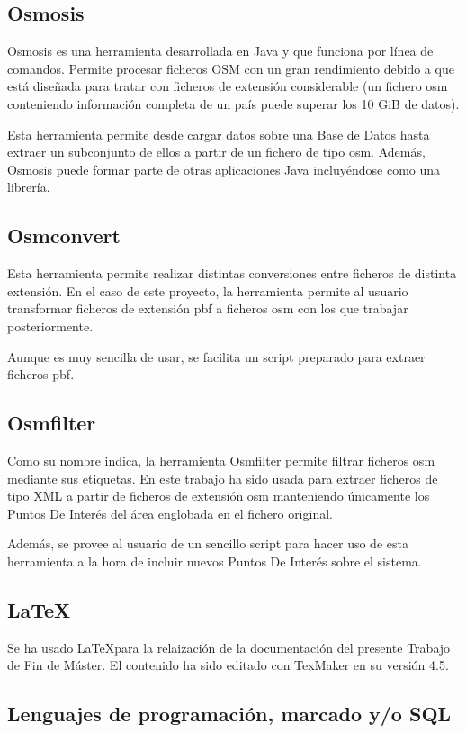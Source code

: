 \subsection{Osmosis}
Osmosis es una herramienta desarrollada en Java y que funciona por línea de comandos. Permite procesar ficheros OSM con un gran rendimiento debido a que está diseñada para tratar con ficheros de extensión considerable (un fichero osm conteniendo información completa de un país puede superar los 10 GiB de datos).

Esta herramienta permite desde cargar datos sobre una Base de Datos hasta extraer un subconjunto de ellos a partir de un fichero de tipo osm. Además, Osmosis puede formar parte de otras aplicaciones Java incluyéndose como una librería.

\subsection{Osmconvert}
Esta herramienta permite realizar distintas conversiones entre ficheros de distinta extensión. En el caso de este proyecto, la herramienta permite al usuario transformar ficheros de extensión pbf a ficheros osm con los que trabajar posteriormente.

Aunque es muy sencilla de usar, se facilita un script preparado para extraer ficheros pbf.

\subsection{Osmfilter}
Como su nombre indica, la herramienta Osmfilter permite filtrar ficheros osm mediante sus etiquetas. En este trabajo ha sido usada para extraer ficheros de tipo XML a partir de ficheros de extensión osm manteniendo únicamente los Puntos De Interés del área englobada en el fichero original.

Además, se provee al usuario de un sencillo script para hacer uso de esta herramienta a la hora de incluir nuevos Puntos De Interés sobre el sistema.

\subsection{\LaTeX}
Se ha usado \LaTeX  para la relaización de la documentación del presente Trabajo de Fin de Máster. El contenido ha sido editado con TexMaker en su versión 4.5.

\subsection{Lenguajes de programación, marcado y/o SQL}

